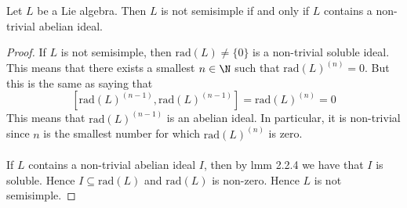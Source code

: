 \documentclass[a4paper]{article}
\begin{document}
\begin{lmm}{}{} Let $L$ be a Lie algebra. Then $L$ is not semisimple if and only if $L$ contains a non-trivial abelian ideal. \tcbline
\begin{proof}
If $L$ is not semisimple, then $\text{rad}(L)\neq\{0\}$ is a non-trivial soluble ideal. This means that there exists a smallest $n\in\N$ such that $\text{rad}(L)^{(n)}=0$. But this is the same as saying that $$[\text{rad}(L)^{(n-1)},\text{rad}(L)^{(n-1)}]=\text{rad}(L)^{(n)}=0$$ This means that $\text{rad}(L)^{(n-1)}$ is an abelian ideal. In particular, it is non-trivial since $n$ is the smallest number for which $\text{rad}(L)^{(n)}$ is zero. \\~\\

If $L$ contains a non-trivial abelian ideal $I$, then by lmm 2.2.4 we have that $I$ is soluble. Hence $I\subseteq\text{rad}(L)$ and $\text{rad}(L)$ is non-zero. Hence $L$ is not semisimple. 
\end{proof}
\end{lmm}
\end{document}
